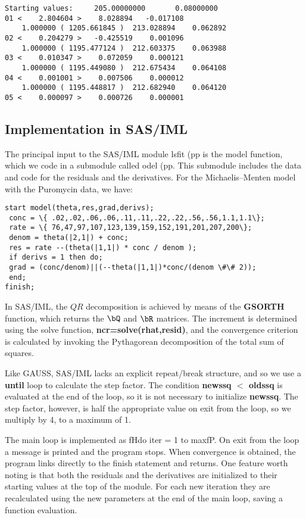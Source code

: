 {\begin{verbatim}
Starting values:     205.00000000       0.08000000
01 <    2.804604 >    8.028894   -0.017108
    1.000000 ( 1205.661845 )  213.028894    0.062892
02 <    0.204279 >   -0.425519    0.001096
    1.000000 ( 1195.477124 )  212.603375    0.063988
03 <    0.010347 >    0.072059    0.000121
    1.000000 ( 1195.449080 )  212.675434    0.064108
04 <    0.001001 >    0.007506    0.000012
    1.000000 ( 1195.448817 )  212.682940    0.064120
05 <    0.000097 >    0.000726    0.000001
\end{verbatim}

\subsection{Implementation in SAS/IML}

The principal input to the SAS/IML module
lsfit\rm%
(pp is the model function, which we code in a
submodule called odel\rm%
(pp.  This submodule includes the
data and code for the residuals and the derivatives.  For the
Michaelis--Menten model with the Puromycin data, we have:
\begin{verbatim}
start model(theta,res,grad,derivs);
 conc = \{ .02,.02,.06,.06,.11,.11,.22,.22,.56,.56,1.1,1.1\};
 rate = \{ 76,47,97,107,123,139,159,152,191,201,207,200\};
 denom = theta(|2,1|) + conc;
 res = rate --(theta(|1,1|) * conc / denom );
 if derivs = 1 then do;
 grad = (conc/denom)||(--theta(|1,1|)*conc/(denom \#\# 2));
 end;
finish;
\end{verbatim}

In SAS/IML, the $QR$ decomposition is achieved by means of the
{\bf GSORTH} function, which returns the $\bQ$ and $\bR$ matrices.
The increment is determined using the solve function,
{\bf ncr=solve(rhat,resid)}, and the convergence criterion
is calculated by invoking the Pythagorean decomposition of the total
sum of squares.

Like GAUSS, SAS/IML lacks an explicit repeat/break
structure, and so we use a {\bf until}
loop to calculate the
step factor.  The condition {\bf newssq $<$ oldssq}
is evaluated at
the end of the loop, so it is not necessary to initialize
{\bf newssq}.  The step factor, however, is half the appropriate
value on exit from the loop, so we multiply by 4, to a maximum of 1.

The main loop is implemented as fHdo iter = 1 to maxfP.  On
exit from the loop a message is printed and the program stops.  When
convergence is obtained, the program links directly to the finish
statement and returns.  One feature worth noting is that both the
residuals and the derivatives are initialized to their starting values
at the top of the module.  For each new iteration they are
recalculated using the new parameters at the end of the main loop,
saving a function evaluation.

}
